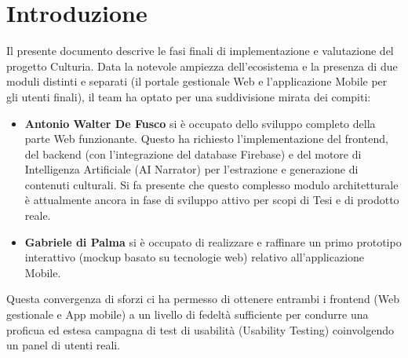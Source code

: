 \section{Introduzione}

Il presente documento descrive le fasi finali di implementazione e valutazione del progetto Culturia. Data la notevole ampiezza dell'ecosistema e la presenza di due moduli distinti e separati (il portale gestionale Web e l'applicazione Mobile per gli utenti finali), il team ha optato per una suddivisione mirata dei compiti:
\begin{itemize}
    \item \textbf{Antonio Walter De Fusco} si è occupato dello sviluppo completo della parte Web funzionante. Questo ha richiesto l'implementazione del frontend, del backend (con l'integrazione del database Firebase) e del motore di Intelligenza Artificiale (AI Narrator) per l'estrazione e generazione di contenuti culturali. Si fa presente che questo complesso modulo architetturale è attualmente ancora in fase di sviluppo attivo per scopi di Tesi e di prodotto reale.
    \item \textbf{Gabriele di Palma} si è occupato di realizzare e raffinare un primo prototipo interattivo (mockup basato su tecnologie web) relativo all'applicazione Mobile.
\end{itemize}

Questa convergenza di sforzi ci ha permesso di ottenere entrambi i frontend (Web gestionale e App mobile) a un livello di fedeltà sufficiente per condurre una proficua ed estesa campagna di test di usabilità (Usability Testing) coinvolgendo un panel di utenti reali.
